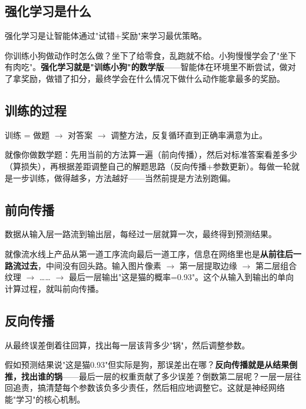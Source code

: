 \documentclass[12pt,a4paper]{ctexart}
\begin{document}
\subsection{强化学习是什么}

\begin{funbox}[一句话解释]
强化学习是让智能体通过"试错+奖励"来学习最优策略。
\end{funbox}

你训练小狗做动作时怎么做？坐下了给零食，乱跑就不给。小狗慢慢学会了"坐下有肉吃"。\textbf{强化学习就是"训练小狗"的数学版}——智能体在环境里不断尝试，做对了拿奖励，做错了扣分，最终学会在什么情况下做什么动作能拿最多的奖励。

\subsection{训练的过程}

\begin{funbox}[一句话解释]
训练 = 做题 $\to$ 对答案 $\to$ 调整方法，反复循环直到正确率满意为止。
\end{funbox}

就像你做数学题：先用当前的方法算一遍（前向传播），然后对标准答案看差多少（算损失），再根据差距调整自己的解题思路（反向传播+参数更新）。每做一轮就是一步训练，做得越多，方法越好——当然前提是方法别跑偏。

\subsection{前向传播}

\begin{funbox}[一句话解释]
数据从输入层一路流到输出层，每经过一层就算一次，最终得到预测结果。
\end{funbox}

就像流水线上产品从第一道工序流向最后一道工序，信息在网络里也是\textbf{从前往后一路流过去}，中间没有回头路。输入图片像素 $\to$ 第一层提取边缘 $\to$ 第二层组合纹理 $\to$ …… $\to$ 最后一层输出"这是猫的概率=0.93"。这个从输入到输出的单向计算过程，就叫前向传播。

\subsection{反向传播}

\begin{funbox}[一句话解释]
从最终误差倒着往回算，找出每一层该背多少"锅"，然后调整参数。
\end{funbox}

假如预测结果说"这是猫0.93"但实际是狗，那误差出在哪？\textbf{反向传播就是从结果倒推，找出谁的锅}——最后一层的权重贡献了多少误差？倒数第二层呢？一层一层往回追责，搞清楚每个参数该负多少责任，然后相应地调整它。这就是神经网络能"学习"的核心机制。
\end{document}
